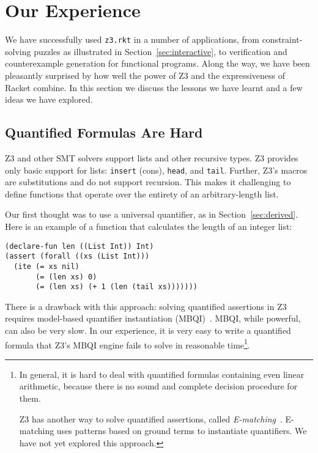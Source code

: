 \section{Our Experience}

We have successfully used \texttt{z3.rkt} in a number of applications, from
constraint-solving puzzles as illustrated in Section~\ref{sec:interactive}, to
verification and counterexample generation for functional programs. Along the
way, we have been pleasantly surprised by how well the power of Z3 and the
expressiveness of Racket combine. In this section we discuss the lessons we
have learnt and a few ideas we have explored.

\subsection{Quantified Formulas Are Hard}
\label{sec:quantified}

Z3 and other SMT solvers support lists and other recursive types. Z3 provides
only basic support for lists: \texttt{insert} (cons), \texttt{head}, and
\texttt{tail}. Further, Z3's macros are substitutions and do not support
recursion. This makes it challenging to define functions that operate over the
entirety of an arbitrary-length list.

Our first thought was to use a universal quantifier, as in
Section~\ref{sec:derived}. Here is an example of a function that calculates
the length of an integer list:

\begin{verbatim}
(declare-fun len ((List Int)) Int)
(assert (forall ((xs (List Int)))
  (ite (= xs nil)
       (= (len xs) 0)
       (= (len xs) (+ 1 (len (tail xs)))))))
\end{verbatim}

There is a drawback with this approach: solving quantified assertions in Z3
requires model-based quantifier instantiation (MBQI)~\cite{mbqi}. MBQI, while
powerful, can also be very slow. In our experience, it is very easy to write a
quantified formula that Z3's MBQI engine fails to solve in reasonable
time\footnote{In general, it is hard to deal with quantified formulas
containing even linear arithmetic, because there is no sound and complete
decision procedure for them\cite{halpern91}.

Z3 has another way to solve quantified assertions, called
\textit{E-matching}~\cite{e-matching}. E-matching uses patterns based on
ground terms to instantiate quantifiers. We have not yet explored this
approach.}.

